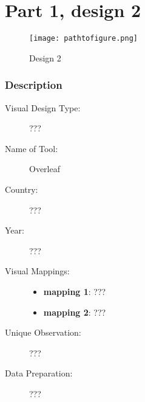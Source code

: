 \hypertarget{part-1-design-2}{%
\section{Part 1, design 2}\label{part-1-design-2}}

\begin{figure}
\centering
\texttt{[image: pathtofigure.png]}
\caption{Design 2}
\end{figure}

\hypertarget{description}{%
\subsubsection{Description}\label{description}}

\begin{description}
\item[Visual Design Type:]
???
\item[Name of Tool:]
Overleaf
\item[Country:]
???
\item[Year:]
???
\item[Visual Mappings:]
\begin{itemize}
\tightlist
\item
  \textbf{mapping 1}: ???
\end{itemize}

\begin{itemize}
\tightlist
\item
  \textbf{mapping 2}: ???
\end{itemize}
\item[Unique Observation:]
???
\item[Data Preparation:]
???
\end{description}
